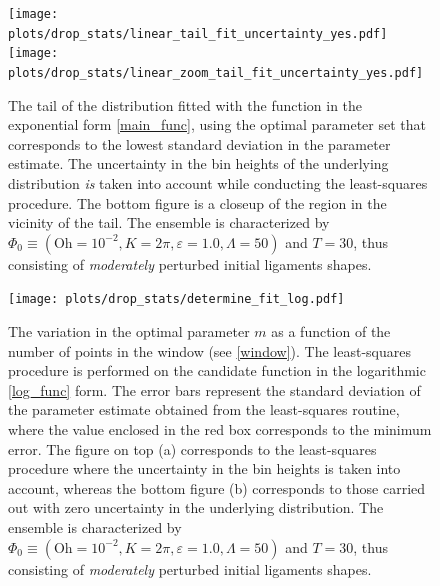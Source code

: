 \begin{figure}
\centering
\texttt{[image: plots/drop\_stats/linear\_tail\_fit\_uncertainty\_yes.pdf]} \\
\texttt{[image: plots/drop\_stats/linear\_zoom\_tail\_fit\_uncertainty\_yes.pdf]} \\ 
\caption{
	The tail of the distribution fitted with the function 
	in the exponential form \eqref{main_func}, using the optimal parameter
	set that corresponds to the lowest standard deviation in the parameter estimate.
	The uncertainty in the bin heights of the underlying distribution \textit{is} 
	taken into account while conducting the least-squares procedure. 
	The bottom figure is a closeup of the region in the vicinity of the tail.
	The ensemble is characterized by $\Phi_0 \equiv \left( \textrm{Oh} = 10^{-2}, K = 2\pi 
	, \varepsilon = 1.0 , \Lambda = 50 \right)$ and $T = 30$, 
	thus consisting of \textit{moderately} perturbed initial ligaments shapes. 
	}
\label{linear_fits_with}
\end{figure}




\begin{figure}
\centering
	\texttt{[image: plots/drop\_stats/determine\_fit\_log.pdf]}
\caption{
	The variation in the optimal parameter $m$ as a 
	function of the number of points in the window (see \ref{window}).
	The least-squares procedure is performed on the 
	candidate function in the logarithmic \eqref{log_func} form.
	The error bars represent the standard deviation of the 
	parameter estimate obtained from the least-squares routine,
	where the value enclosed in the red box corresponds to the minimum error.
	The figure on top (a) corresponds to the least-squares procedure where the 
	uncertainty in the bin heights is taken into account, whereas the bottom 
	figure (b) corresponds to those carried out with zero uncertainty in the underlying distribution. 
	The ensemble is characterized by $\Phi_0 \equiv \left( \textrm{Oh} = 10^{-2}, K = 2\pi 
	, \varepsilon = 1.0 , \Lambda = 50 \right)$ and $T = 30$, 
	thus consisting of \textit{moderately} perturbed initial ligaments shapes. 
	}
\label{determine_log}
\end{figure}


